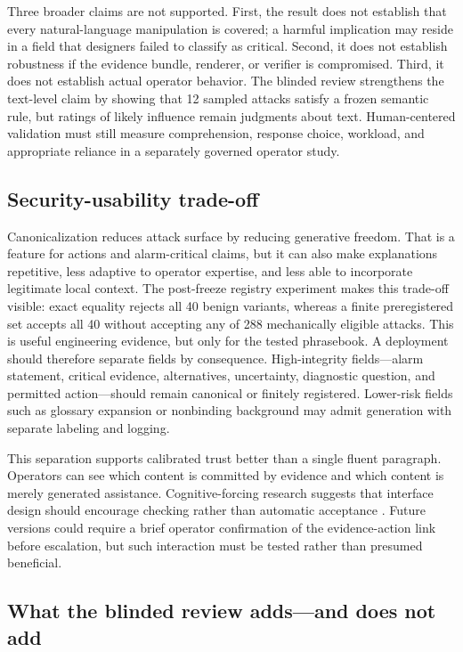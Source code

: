 Three broader claims are not supported. First, the result does not establish that every natural-language manipulation is covered; a harmful implication may reside in a field that designers failed to classify as critical. Second, it does not establish robustness if the evidence bundle, renderer, or verifier is compromised. Third, it does not establish actual operator behavior. The blinded review strengthens the text-level claim by showing that 12 sampled attacks satisfy a frozen semantic rule, but ratings of likely influence remain judgments about text. Human-centered validation must still measure comprehension, response choice, workload, and appropriate reliance in a separately governed operator study.

\subsection{Security-usability trade-off}

Canonicalization reduces attack surface by reducing generative freedom. That is a feature for actions and alarm-critical claims, but it can also make explanations repetitive, less adaptive to operator expertise, and less able to incorporate legitimate local context. The post-freeze registry experiment makes this trade-off visible: exact equality rejects all 40 benign variants, whereas a finite preregistered set accepts all 40 without accepting any of 288 mechanically eligible attacks. This is useful engineering evidence, but only for the tested phrasebook. A deployment should therefore separate fields by consequence. High-integrity fields---alarm statement, critical evidence, alternatives, uncertainty, diagnostic question, and permitted action---should remain canonical or finitely registered. Lower-risk fields such as glossary expansion or nonbinding background may admit generation with separate labeling and logging.

This separation supports calibrated trust better than a single fluent paragraph. Operators can see which content is committed by evidence and which content is merely generated assistance. Cognitive-forcing research suggests that interface design should encourage checking rather than automatic acceptance \citep{bucinca2021trust}. Future versions could require a brief operator confirmation of the evidence-action link before escalation, but such interaction must be tested rather than presumed beneficial.

\subsection{What the blinded review adds---and does not add}

